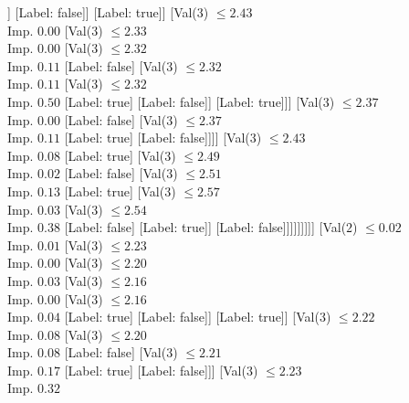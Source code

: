 \documentclass[margin=10pt]{standalone}
\begin{document}
\begin{forest}
												[Val($3$) $ \leq 2.21$ \\ Imp. $0.11$
													[Label: false]
													[Label: true]]
												[Label: false]]
											[Label: true]]
										[Val($3$) $ \leq 2.43$ \\ Imp. $0.00$
											[Val($3$) $ \leq 2.33$ \\ Imp. $0.00$
												[Val($3$) $ \leq 2.32$ \\ Imp. $0.11$
													[Label: false]
													[Val($3$) $ \leq 2.32$ \\ Imp. $0.11$
														[Val($3$) $ \leq 2.32$ \\ Imp. $0.50$
															[Label: true]
															[Label: false]]
														[Label: true]]]
												[Val($3$) $ \leq 2.37$ \\ Imp. $0.00$
													[Label: false]
													[Val($3$) $ \leq 2.37$ \\ Imp. $0.11$
														[Label: true]
														[Label: false]]]]
											[Val($3$) $ \leq 2.43$ \\ Imp. $0.08$
												[Label: true]
												[Val($3$) $ \leq 2.49$ \\ Imp. $0.02$
													[Label: false]
													[Val($3$) $ \leq 2.51$ \\ Imp. $0.13$
														[Label: true]
														[Val($3$) $ \leq 2.57$ \\ Imp. $0.03$
															[Val($3$) $ \leq 2.54$ \\ Imp. $0.38$
																[Label: false]
																[Label: true]]
															[Label: false]]]]]]]]]
							[Val($2$) $ \leq 0.02$ \\ Imp. $0.01$
								[Val($3$) $ \leq 2.23$ \\ Imp. $0.00$
									[Val($3$) $ \leq 2.20$ \\ Imp. $0.03$
										[Val($3$) $ \leq 2.16$ \\ Imp. $0.00$
											[Val($3$) $ \leq 2.16$ \\ Imp. $0.04$
												[Label: true]
												[Label: false]]
											[Label: true]]
										[Val($3$) $ \leq 2.22$ \\ Imp. $0.08$
											[Val($3$) $ \leq 2.20$ \\ Imp. $0.08$
												[Label: false]
												[Val($3$) $ \leq 2.21$ \\ Imp. $0.17$
													[Label: true]
													[Label: false]]]
											[Val($3$) $ \leq 2.23$ \\ Imp. $0.32$

\end{forest}
\end{document}
